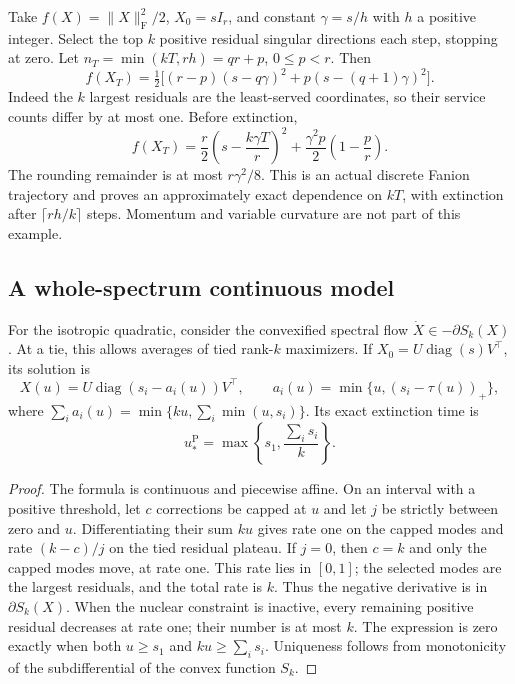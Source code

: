 \documentclass[11pt]{article}
\newcommand{\F}[1]{\lVert #1\rVert_{\mathrm F}}
\begin{document}
Take $f(X)=\F{X}^2/2$, $X_0=sI_r$, and constant $\gamma=s/h$ with
$h$ a positive integer. Select the top $k$ positive residual singular
directions each step, stopping at zero. Let
$n_T=\min(kT,rh)=qr+p$, $0\leq p<r$. Then
\begin{equation}\label{eq:flatdiscrete}
 f(X_T)=\tfrac12\bigl[(r-p)(s-q\gamma)^2
                 +p(s-(q+1)\gamma)^2\bigr].
\end{equation}
Indeed the $k$ largest residuals are the least-served coordinates, so their
service counts differ by at most one. Before extinction,
\begin{equation}\label{eq:flatapprox}
 f(X_T)=\frac r2\left(s-\frac{k\gamma T}{r}\right)^2
               +\frac{\gamma^2p}{2}\left(1-\frac pr\right).
\end{equation}
The rounding remainder is at most $r\gamma^2/8$. This is an actual discrete
Fanion trajectory and proves an approximately exact dependence on $kT$,
with extinction after $\lceil rh/k\rceil$ steps. Momentum and variable
curvature are not part of this example.

\subsection{A whole-spectrum continuous model}

For the isotropic quadratic, consider the convexified spectral flow
$\dot X\in-\partial S_k(X)$. At a tie, this allows averages of tied
rank-$k$ maximizers. If $X_0=U\operatorname{diag}(s)V^\top$, its solution is
\begin{equation}\label{eq:flow}
 X(u)=U\operatorname{diag}(s_i-a_i(u))V^\top,\qquad
 a_i(u)=\min\{u,(s_i-\tau(u))_+\},
\end{equation}
where $\sum_i a_i(u)=\min\{ku,\sum_i\min(u,s_i)\}$.
Its exact extinction time is
\begin{equation}\label{eq:extinction}
 u_*^{\mathrm{P}}=\max\left\{s_1,\frac{\sum_i s_i}{k}\right\}.
\end{equation}

\begin{proof}
The formula is continuous and piecewise affine. On an interval with a
positive threshold, let $c$ corrections be capped at $u$ and let $j$ be
strictly between zero and $u$. Differentiating their sum $ku$ gives rate
one on the capped modes and rate $(k-c)/j$ on the tied residual plateau.
If $j=0$, then $c=k$ and only the capped modes move, at rate one.
This rate lies in $[0,1]$; the selected modes are the largest residuals, and
the total rate is $k$. Thus the negative derivative is in
$\partial S_k(X)$. When the nuclear constraint is inactive, every remaining
positive residual decreases at rate one; their number is at most $k$.
The expression is zero exactly when both $u\geq s_1$ and
$ku\geq\sum_i s_i$. Uniqueness follows from monotonicity of the
subdifferential of the convex function $S_k$.
\end{proof}
\end{document}
